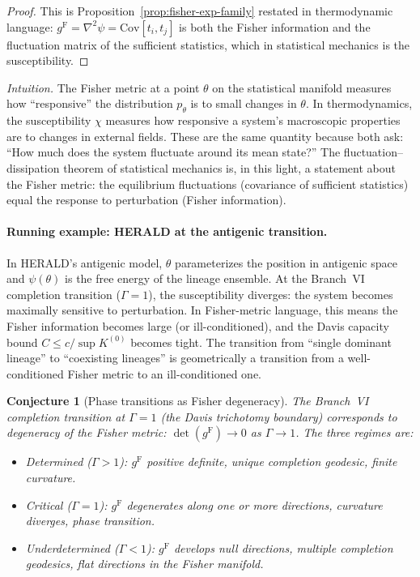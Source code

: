 \documentclass[11pt]{article}
\newcommand{\Cov}{\mathrm{Cov}}
\newcommand{\gF}{g^{\mathrm{F}}}
\newtheorem{conjecture}{Conjecture}
\theoremstyle{remark}
\begin{document}
\begin{proof}
This is Proposition~\ref{prop:fisher-exp-family} restated in
thermodynamic language: $\gF = \nabla^2 \psi = \Cov[t_i, t_j]$ is both
the Fisher information and the fluctuation matrix of the sufficient
statistics, which in statistical mechanics is the susceptibility.
\end{proof}

\noindent\emph{Intuition.}  The Fisher metric at a point $\theta$ on the
statistical manifold measures how ``responsive'' the distribution $p_\theta$
is to small changes in $\theta$.  In thermodynamics, the susceptibility
$\chi$ measures how responsive a system's macroscopic properties are to
changes in external fields.  These are the same quantity because both ask:
``How much does the system fluctuate around its mean state?''  The
fluctuation--dissipation theorem of statistical mechanics is, in this light,
a statement about the Fisher metric: the equilibrium fluctuations (covariance
of sufficient statistics) equal the response to perturbation (Fisher
information).

\paragraph{Running example: HERALD at the antigenic transition.}
In HERALD's antigenic model, $\theta$ parameterizes the position in antigenic
space and $\psi(\theta)$ is the free energy of the lineage ensemble.  At
the Branch~VI completion transition ($\Gamma = 1$), the susceptibility
diverges: the system becomes maximally sensitive to perturbation.  In
Fisher-metric language, this means the Fisher information becomes large
(or ill-conditioned), and the Davis capacity bound
$C \le c / \sup K^{(0)}$ becomes tight.  The transition from ``single
dominant lineage'' to ``coexisting lineages'' is geometrically a transition
from a well-conditioned Fisher metric to an ill-conditioned one.

\begin{conjecture}[Phase transitions as Fisher degeneracy]
\label{conj:phase-transition}
The Branch~VI completion transition at $\Gamma = 1$ (the Davis trichotomy
boundary) corresponds to degeneracy of the Fisher metric:
$\det(\gF) \to 0$ as $\Gamma \to 1$.  The three regimes are:
\begin{itemize}
  \item Determined ($\Gamma > 1$): $\gF$ positive definite, unique completion
  geodesic, finite curvature.
  \item Critical ($\Gamma = 1$): $\gF$ degenerates along one or more
  directions, curvature diverges, phase transition.
  \item Underdetermined ($\Gamma < 1$): $\gF$ develops null directions,
  multiple completion geodesics, flat directions in the Fisher manifold.
\end{itemize}
\end{conjecture}
\end{document}
